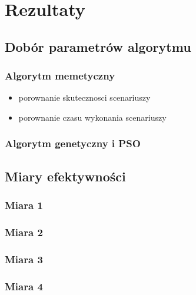 \chapter{Rezultaty}
\section{Dobór parametrów algorytmu}
\subsection{Algorytm memetyczny}
\begin{itemize}
\item porownanie skutecznosci scenariuszy
\item porownanie czasu wykonania scenariuszy
\end{itemize}
\subsection{Algorytm genetyczny i PSO}
\section{Miary efektywności}
\subsection{Miara 1}
\subsection{Miara 2}
\subsection{Miara 3}
\subsection{Miara 4}